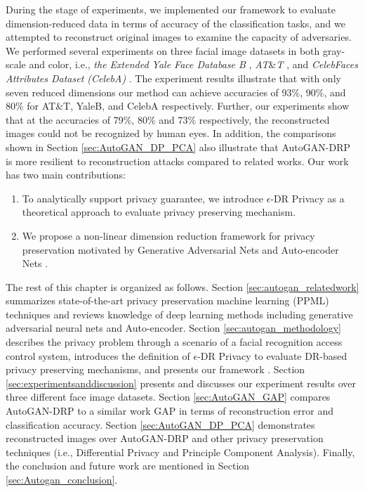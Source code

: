 During the stage of experiments, we implemented our framework to evaluate dimension-reduced data in terms of accuracy of the classification tasks, and we attempted to reconstruct original images to examine the capacity of adversaries. We performed several experiments on three facial image datasets in both gray-scale and color, i.e., \textit{the Extended Yale Face Database B} \cite{GeBeKr01}, \textit{AT}\&\textit{T} \cite{341300}, and \textit{CelebFaces Attributes Dataset (CelebA)} \cite{celeba}. The experiment results illustrate that with only seven reduced dimensions our method can achieve accuracies of 93\%, 90\%, and 80\% for AT\&T, YaleB, and CelebA respectively. Further, our experiments show that at the accuracies of 79\%, 80\% and 73\% respectively, the reconstructed images could not be recognized by human eyes. In addition, the comparisons shown in Section \ref{sec:AutoGAN_DP_PCA} also illustrate that AutoGAN-DRP is more resilient to reconstruction attacks compared to related works.
Our work has two main contributions:
\begin{enumerate}
\item To analytically support privacy guarantee, we introduce $\epsilon$-DR Privacy as a theoretical approach to evaluate privacy preserving mechanism.
\item We propose a non-linear dimension reduction framework for privacy preservation motivated by Generative Adversarial Nets \cite{Goodfellow2014} and Auto-encoder Nets \cite{Baldi2012}. 
  
\end{enumerate}
The rest of this chapter is organized as follows. Section \ref{sec:autogan_relatedwork} summarizes state-of-the-art privacy preservation machine learning (PPML) techniques and reviews knowledge of deep learning methods including generative adversarial neural nets and Auto-encoder. Section \ref{sec:autogan_methodology} describes the privacy problem through a scenario of a facial recognition access control system, introduces the definition of $\epsilon$-DR Privacy to evaluate DR-based privacy preserving mechanisms, and presents our framework \Name. Section \ref{sec:experimentsanddiscussion} presents and discusses our experiment results over three different face image datasets. Section \ref{sec:AutoGAN_GAP} compares AutoGAN-DRP to a similar work GAP in terms of reconstruction error and classification accuracy. Section \ref{sec:AutoGAN_DP_PCA} demonstrates reconstructed images over AutoGAN-DRP and other privacy preservation techniques (i.e., Differential Privacy and Principle Component Analysis). Finally, the conclusion and future work are mentioned in Section \ref{sec:Autogan_conclusion}. 
